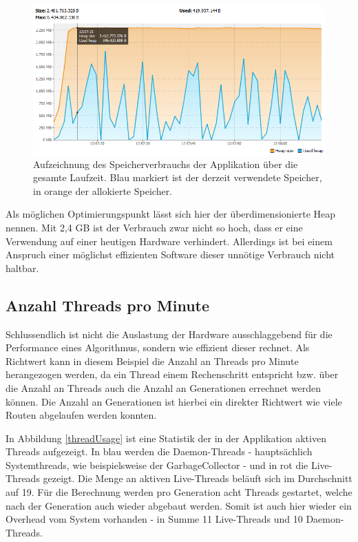 \begin{figure}[h]
	\centering
	\includegraphics[width=0.9\linewidth]{images/heapUsage.png}
	\caption{Aufzeichnung des Speicherverbrauchs der Applikation über die gesamte Laufzeit. Blau markiert ist der derzeit verwendete Speicher, in orange der allokierte Speicher.}
	\label{heapUsage}
\end{figure}

Als möglichen Optimierungspunkt lässt sich hier der überdimensionierte Heap nennen. Mit 2,4 GB ist der Verbrauch zwar nicht so hoch, dass er eine Verwendung auf einer heutigen Hardware verhindert. Allerdings ist bei einem Anspruch einer möglichst effizienten Software dieser unnötige Verbrauch nicht haltbar.

\subsection{Anzahl Threads pro Minute}
Schlussendlich ist nicht die Auslastung der Hardware ausschlaggebend für die Performance eines Algorithmus, sondern wie effizient dieser rechnet. Als Richtwert kann in diesem Beispiel die Anzahl an Threads pro Minute herangezogen werden, da ein Thread einem Rechenschritt entspricht bzw. über die Anzahl an Threads auch die Anzahl an Generationen errechnet werden können. Die Anzahl an Generationen ist hierbei ein direkter Richtwert wie viele Routen abgelaufen werden konnten.

In Abbildung \ref{threadUsage} ist eine Statistik der in der Applikation aktiven Threads aufgezeigt. In blau werden die Daemon-Threads - hauptsächlich Systemthreads, wie beispielsweise der GarbageCollector - und in rot die Live-Threads gezeigt. Die Menge an aktiven Live-Threads beläuft sich im Durchschnitt auf 19. Für die Berechnung werden pro Generation acht Threads gestartet, welche nach der Generation auch wieder abgebaut werden. Somit ist auch hier wieder ein Overhead vom System vorhanden - in Summe 11 Live-Threads und 10 Daemon-Threads.

